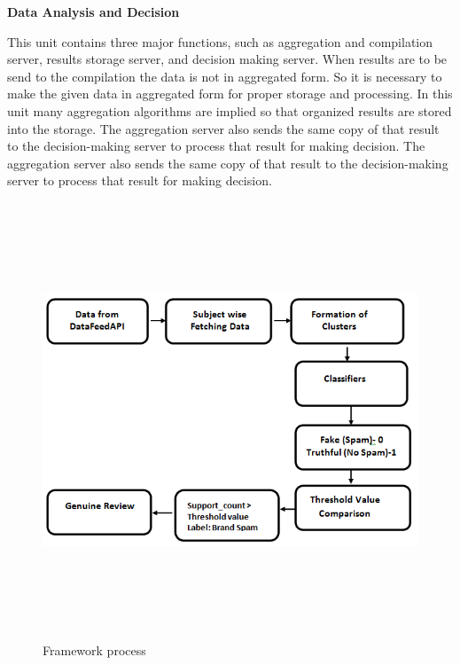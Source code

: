\documentclass[oneside,a4paper,12pt]{book}
\begin{document}
\textbf{Data Analysis and Decision}
\par This unit contains three major functions, such as aggregation and compilation server, results storage server, and decision making server. When results are to be send to the compilation the data is not in aggregated form. So it is necessary to make the given data in aggregated form for proper storage and processing. In this unit many aggregation algorithms are implied so that organized results are stored into the storage. The aggregation server also sends the same copy of that result to the decision-making server to process that result for making decision. The aggregation server also sends the same copy of that result to the decision-making server to process that result for making decision.
\begin{figure}[h!]
  \centering
  \includegraphics[width=15cm,
  height=13cm]{system.png}
  \caption{Framework process}
\end{figure}
\end{document}
